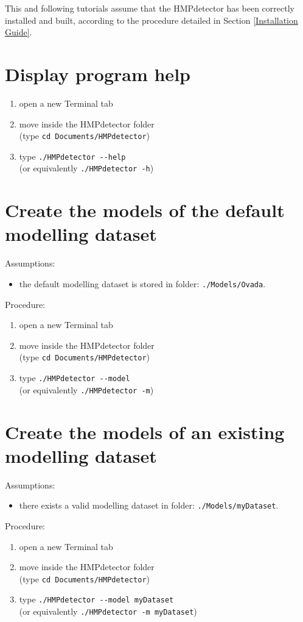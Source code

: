 \documentclass[10pt,a4paper]{report}
\begin{document}
This and following tutorials assume that the HMPdetector has been correctly installed and built, according to the procedure detailed in Section \ref{Installation Guide}.

\section{Display program help}
\begin{enumerate}
\item open a new Terminal tab
\item move inside the HMPdetector folder\\
(type \verb+cd Documents/HMPdetector+)
\item type \verb+./HMPdetector --help+\\
(or equivalently \verb+./HMPdetector -h+)
\end{enumerate}

\section{Create the models of the default modelling dataset}
Assumptions:
\begin{itemize}
\item the default modelling dataset is stored in folder: \verb+./Models/Ovada+.
\end{itemize}
Procedure:
\begin{enumerate}
\item open a new Terminal tab
\item move inside the HMPdetector folder\\
(type \verb+cd Documents/HMPdetector+)
\item type \verb+./HMPdetector --model+\\
(or equivalently \verb+./HMPdetector -m+)
\end{enumerate}

\section{Create the models of an existing modelling dataset}
\label{Create the models of an existing modelling dataset}
Assumptions:
\begin{itemize}
\item there exists a valid modelling dataset in folder: \verb+./Models/myDataset+.
\end{itemize}
Procedure:
\begin{enumerate}
\item open a new Terminal tab
\item move inside the HMPdetector folder\\
(type \verb+cd Documents/HMPdetector+)
\item type \verb+./HMPdetector --model myDataset+\\
(or equivalently \verb+./HMPdetector -m myDataset+)
\end{enumerate}
\end{document}
